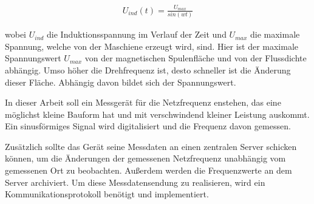 \begin{align} 
	U_{ind}(t) = \frac{U_{max}}{sin(wt)}
\end{align}

wobei $U_{ind}$ die Induktionsspannung im Verlauf der Zeit und $U_{max}$ die maximale Spannung, welche von der Maschiene erzeugt wird, sind. Hier ist der maximale Spannungswert $U_{max}$ von der magnetischen Spulenfläche und von der Flussdichte abhängig. Umso höher die Drehfrequenz ist, desto schneller ist die Änderung dieser Fläche. Abhängig davon bildet sich der Spannungswert. \smallskip \smallskip



In dieser Arbeit soll ein Messgerät für die Netzfrequenz enstehen, das eine möglichst kleine Bauform hat und mit verschwindend kleiner Leistung auskommt. Ein sinusförmiges Signal wird digitalisiert und die Frequenz davon gemessen. \smallskip \smallskip

Zusätzlich sollte das Gerät seine Messdaten an einen zentralen Server schicken können, um die Änderungen der gemessenen Netzfrequenz unabhängig vom gemessenen Ort zu beobachten. Außerdem werden die Frequenzwerte an dem Server archiviert. Um diese Messdatensendung zu realisieren, wird ein Kommunikationsprotokoll benötigt und implementiert.

